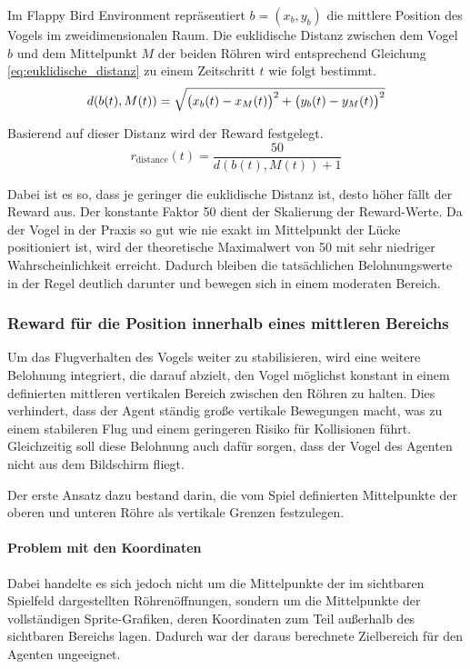 \documentclass[conference]{IEEEtran}
\begin{document}
Im Flappy Bird Environment repräsentiert \( b = (x_b, y_b) \) die mittlere Position des Vogels im zweidimensionalen Raum. Die euklidische Distanz zwischen dem Vogel \(b\) und dem Mittelpunkt \(M\) der beiden Röhren wird entsprechend Gleichung \ref{eq:euklidische_distanz} zu einem Zeitschritt \(t\) wie folgt bestimmt.
\begin{equation}
	\small
	d(b(t), M(t)) = \sqrt{ \bigl(x_b(t) - x_M(t)\bigr)^2 + \bigl(y_b(t) - y_M(t)\bigr)^2}
\end{equation}                 
                                 
Basierend auf dieser Distanz wird der Reward festgelegt.
\begin{equation}
	r_{\text{distance}}(t) = \frac{50}{d(b(t), M(t)) + 1}
\end{equation}

Dabei ist es so, dass je geringer die euklidische Distanz ist, desto höher fällt der Reward aus. Der konstante Faktor 50 dient der Skalierung der Reward-Werte. Da der Vogel in der Praxis so gut wie nie exakt im Mittelpunkt der Lücke positioniert ist, wird der theoretische Maximalwert von 50 mit sehr niedriger Wahrscheinlichkeit erreicht. Dadurch bleiben die tatsächlichen Belohnungswerte in der Regel deutlich darunter und bewegen sich in einem moderaten Bereich.\\

\subsubsection{Reward für die Position innerhalb eines mittleren Bereichs}\label{reward_shaping_third}
Um das Flugverhalten des Vogels weiter zu stabilisieren, wird eine weitere Belohnung integriert, die darauf abzielt, den Vogel möglichst konstant in einem definierten mittleren vertikalen Bereich zwischen den Röhren zu halten. Dies verhindert, dass der Agent ständig große vertikale Bewegungen macht, was zu einem stabileren Flug und einem geringeren Risiko für Kollisionen führt. Gleichzeitig soll diese Belohnung auch dafür sorgen, dass der Vogel des Agenten nicht aus dem Bildschirm fliegt. 

Der erste Ansatz dazu bestand darin, die vom Spiel definierten Mittelpunkte der oberen und unteren Röhre als vertikale Grenzen festzulegen.

\paragraph{Problem mit den Koordinaten}
Dabei handelte es sich jedoch nicht um die Mittelpunkte der im sichtbaren Spielfeld dargestellten Röhrenöffnungen, sondern um die Mittelpunkte der vollständigen Sprite-Grafiken, deren Koordinaten zum Teil außerhalb des sichtbaren Bereichs lagen. Dadurch war der daraus berechnete Zielbereich für den Agenten ungeeignet.
\end{document}
